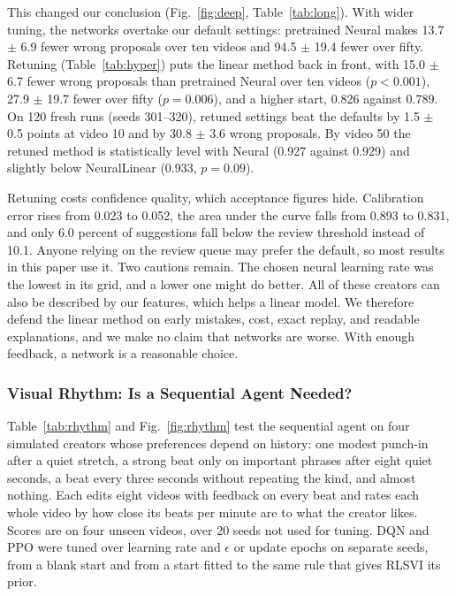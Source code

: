 \documentclass{ieeeaccess}
\begin{document}
This changed our conclusion (Fig.~\ref{fig:deep}, Table~\ref{tab:long}). With wider tuning, the networks overtake our default settings: pretrained Neural makes 13.7 $\pm$ 6.9 fewer wrong proposals over ten videos and 94.5 $\pm$ 19.4 fewer over fifty. Retuning (Table~\ref{tab:hyper}) puts the linear method back in front, with 15.0 $\pm$ 6.7 fewer wrong proposals than pretrained Neural over ten videos ($p<0.001$), 27.9 $\pm$ 19.7 fewer over fifty ($p=0.006$), and a higher start, 0.826 against 0.789. On 120 fresh runs (seeds 301--320), retuned settings beat the defaults by 1.5 $\pm$ 0.5 points at video 10 and by 30.8 $\pm$ 3.6 wrong proposals. By video 50 the retuned method is statistically level with Neural (0.927 against 0.929) and slightly below NeuralLinear (0.933, $p=0.09$).

Retuning costs confidence quality, which acceptance figures hide. Calibration error rises from 0.023 to 0.052, the area under the curve falls from 0.893 to 0.831, and only 6.0 percent of suggestions fall below the review threshold instead of 10.1. Anyone relying on the review queue may prefer the default, so most results in this paper use it. Two cautions remain. The chosen neural learning rate was the lowest in its grid, and a lower one might do better. All of these creators can also be described by our features, which helps a linear model. We therefore defend the linear method on early mistakes, cost, exact replay, and readable explanations, and we make no claim that networks are worse. With enough feedback, a network is a reasonable choice.

\subsubsection{Visual Rhythm: Is a Sequential Agent Needed?}
Table~\ref{tab:rhythm} and Fig.~\ref{fig:rhythm} test the sequential agent on four simulated creators whose preferences depend on history: one modest punch-in after a quiet stretch, a strong beat only on important phrases after eight quiet seconds, a beat every three seconds without repeating the kind, and almost nothing. Each edits eight videos with feedback on every beat and rates each whole video by how close its beats per minute are to what the creator likes. Scores are on four unseen videos, over 20 seeds not used for tuning. DQN and PPO were tuned over learning rate and $\epsilon$ or update epochs on separate seeds, from a blank start and from a start fitted to the same rule that gives RLSVI its prior.
\end{document}
